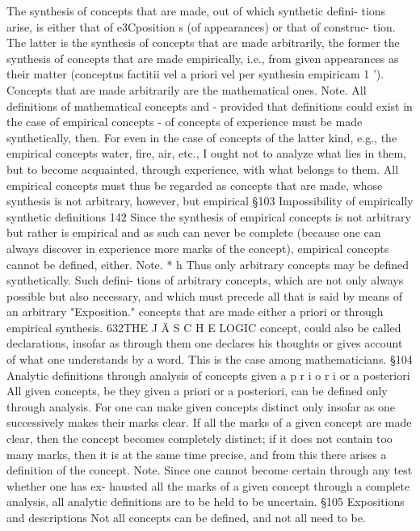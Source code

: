 {The synthesis of concepts that are made, out of which synthetic defini-
tions arise, is either that of e3Cposition s (of appearances) or that of construc-
tion. The latter is the synthesis of concepts that are made arbitrarily, the
former the synthesis of concepts that are made empirically, i.e., from given
appearances as their matter (conceptus factitii vel a priori vel per synthesin
empiricam 1 '). Concepts that are made arbitrarily are the mathematical ones.
Note.
All definitions of mathematical concepts and - provided that definitions
could exist in the case of empirical concepts - of concepts of experience
must be made synthetically, then. For even in the case of concepts of the
latter kind, e.g., the empirical concepts water, fire, air, etc., I ought not to
analyze what lies in them, but to become acquainted, through experience,
with what belongs to them. All empirical concepts must thus be regarded as
concepts that are made, whose synthesis is not arbitrary, however, but
empirical
§103
Impossibility of empirically synthetic definitions
142
Since the synthesis of empirical concepts is not arbitrary but rather is
empirical and as such can never be complete (because one can always
discover in experience more marks of the concept), empirical concepts
cannot be defined, either.
Note.
*
h
Thus only arbitrary concepts may be defined synthetically. Such defini-
tions of arbitrary concepts, which are not only always possible but also
necessary, and which must precede all that is said by means of an arbitrary
"Exposition."
concepts that are made either a priori or through empirical synthesis.
632THE J Ä S C H E LOGIC
concept, could also be called declarations, insofar as through them one
declares his thoughts or gives account of what one understands by a word.
This is the case among mathematicians.
§104
Analytic definitions through analysis of concepts given a p r i o r i or a
posteriori
All given concepts, be they given a priori or a posteriori, can be defined only
through analysis. For one can make given concepts distinct only insofar as
one successively makes their marks clear. If all the marks of a given
concept are made clear, then the concept becomes completely distinct; if it
does not contain too many marks, then it is at the same time precise, and
from this there arises a definition of the concept.
Note.
Since one cannot become certain through any test whether one has ex-
hausted all the marks of a given concept through a complete analysis, all
analytic definitions are to be held to be uncertain.
§105
Expositions and descriptions
Not all concepts can be defined, and not all need to be.
}
